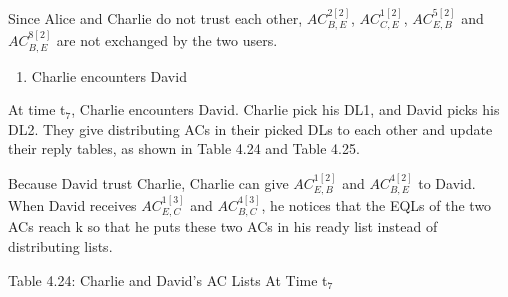 Since Alice and Charlie do not trust each other, ${AC}^{2\left[2\right]}_{B,E}$, ${AC}^{1\left[2\right]}_{C,E}$, ${AC}^{5\left[2\right]}_{E,B}$ and ${AC}^{8\left[2\right]}_{B,E}$ are not exchanged by the two users.

\begin{enumerate}
\item  Charlie encounters David
\end{enumerate}

\noindent At time t${}_{7}$, Charlie encounters David. Charlie pick his DL1, and David picks his DL2. They give distributing ACs in their picked DLs to each other and update their reply tables, as shown in Table 4.24 and Table 4.25.

\noindent Because David trust Charlie, Charlie can give ${AC}^{1\left[2\right]}_{E,B}$ and ${AC}^{4\left[2\right]}_{B,E}$ to David. When David receives ${AC}^{1\left[3\right]}_{E,C}$ and ${AC}^{4\left[3\right]}_{B,C}$, he notices that the EQLs of the two ACs reach $\mathrm{k}$ so that he puts these two ACs in his ready list instead of distributing lists.

\noindent 

\noindent 

Table 4.24: Charlie and David's AC Lists At Time t${}_{7}$


